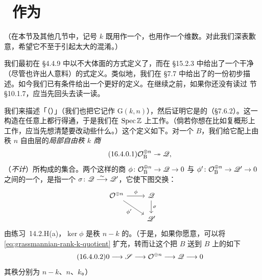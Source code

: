 
\section{\hard\ \trGrassmannian{}作为\trModuliSpace}

（在本节及其他几节中，记号 $k$ 既用作一个\trField，也用作一个维数。对此我们深表歉意，希望它不至于引起太大的混淆。）

我们最初在 \S4.4.9 中以不大体面的方式定义了\trProjectiveSpace，而在 \S15.2.3 中给出了一个干净（尽管也许出人意料）的\trFunctor{}式定义。类似地，我们在 \S7.7 中给出了\trGrassmannian{}的一份初步描述。如今我们已有条件给出一个更好的定义。在继续之前，如果你还没有读过 \extrahard{}节 \S10.1.7，应当先回头去读一读。

我们来描述「\trGrassmannian{}（\trContravariantFunctor）」（我们也把它记作 $\mathrm{G}(k,n)$），然后证明它是\trRepresentable{}的（\S7.6.2）。这一构造在任意\trBaseScheme{}上都行得通，于是我们在\trFinalObject{} $\operatorname{Spec}\mathbb{Z}$ 上工作。（倘若你想在比如复概形上工作，应当先想清楚要改动些什么。）这个\trFunctor{}定义如下。对一个\trScheme{} $B$，我们给它配上由秩 $n$ 自由层的\emph{局部自由秩 $k$ 商}
\begin{equation*}\tag{16.4.0.1}\label{eq:grassmannian-rank-k-quotient}
\mathcal{O}_{\mathrm{B}}^{\oplus n}\twoheadrightarrow\mathscr{Q},
\end{equation*}
（\emph{不计\trIsomorphism}）所构成的集合。两个这样的商 $\phi\colon\mathcal{O}_{\mathrm{B}}^{\oplus n}\to\mathscr{Q}\to 0$ 与 $\phi'\colon\mathcal{O}_{\mathrm{B}}^{\oplus n}\to\mathscr{Q}'\to 0$ 之间的一个\trIsomorphism，是指一个\trIsomorphism{} $\sigma\colon\mathscr{Q}\overset{\sim}{\longrightarrow}\mathscr{Q}'$，它使下图交换：
\[
\begin{tikzcd}
\OO^{\oplus n} \ar[r, "\phi"] \ar[dr, "\phi'"'] & \scr{Q} \ar[d, "\sigma"] \\
& \scr{Q}'
\end{tikzcd}
\]
由\mbox{练习~14.2.H}(a)，$\ker\phi$ 是秩 $n-k$ 的\trLocallyFreeSheaf。（于是，如果你愿意，可以将 \eqref{eq:grassmannian-rank-k-quotient} 扩充，转而让这个\trFunctor{}把 $B$ 送到 $B$ 上\trLocallyFreeSheaf{}的如下\trShortExactSequence
\begin{equation*}\tag{16.4.0.2}\label{eq:grassmannian-tautological-ses}
0\longrightarrow\mathscr{S}\longrightarrow\mathcal{O}^{\oplus n}\longrightarrow\mathscr{Q}\longrightarrow 0
\end{equation*}
其秩分别为 $n-k$、$n$、$k$。）

